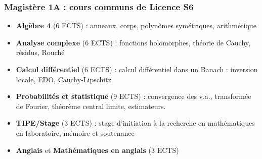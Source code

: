 \documentclass[slidetop,11pt]{beamer}
\begin{document}
\begin{frame}
\frametitle{Magistère 1A : cours communs de Licence S6}


\begin{itemize}
\item \textbf{Algèbre 4} (6 ECTS) : anneaux, corps, polynômes symétriques, arithmétique
\item \textbf{Analyse complexe} (6 ECTS) : fonctions holomorphes, théorie de Cauchy, résidus, Rouché
\item \textbf{Calcul différentiel} (6 ECTS) : calcul différentiel dans un Banach : inversion locale, EDO, Cauchy-Lipschitz
\item \textbf{Probabilités et statistique} (9 ECTS) : convergence des v.a., transformée de Fourier, théorème central limite, estimateurs.
\item \textbf{TIPE/Stage} (3 ECTS) : stage d'initiation à la recherche en mathématiques en laboratoire, mémoire et soutenance
\item \textbf{Anglais} et \textbf{Mathématiques en anglais} (3 ECTS)
\end{itemize}
\end{frame}
\end{document}
